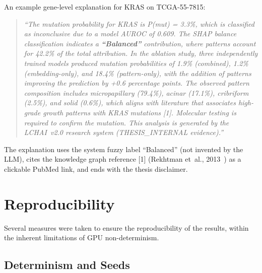 An example gene-level explanation for KRAS on TCGA-55-7815:
\begin{quote}
\emph{``The mutation probability for KRAS is P(mut) = 3.3\%, which
is classified as inconclusive due to a model AUROC of 0.609.
The SHAP balance classification indicates a \textbf{``Balanced''}
contribution, where patterns account for 42.2\% of the total
attribution.
In the ablation study, three independently trained models produced
mutation probabilities of 1.9\% (combined), 1.2\% (embedding-only),
and 18.4\% (pattern-only), with the addition of patterns improving
the prediction by +0.6 percentage points.
The observed pattern composition includes micropapillary (79.4\%),
acinar (17.1\%), cribriform (2.5\%), and solid (0.6\%),
which aligns with literature that associates high-grade growth patterns
with KRAS mutations [1].
Molecular testing is required to confirm the mutation.
This analysis is generated by the LCHAI~v2.0 research system
(THESIS\_INTERNAL evidence).''}
\end{quote}

The explanation uses the system fuzzy label ``Balanced'' (not
invented by the LLM), cites the knowledge graph reference [1]
(Rekhtman et~al., 2013~\cite{rekhtman2013krassolid}) as a clickable
PubMed link, and ends with the thesis disclaimer.
 


\section{Reproducibility}
\label{sec:impl:reproducibility}

Several measures were taken to ensure the reproducibility of the results, within the inherent limitations of GPU non-determinism.

\subsection{Determinism and Seeds}
\label{sec:impl:repro:seeds}

